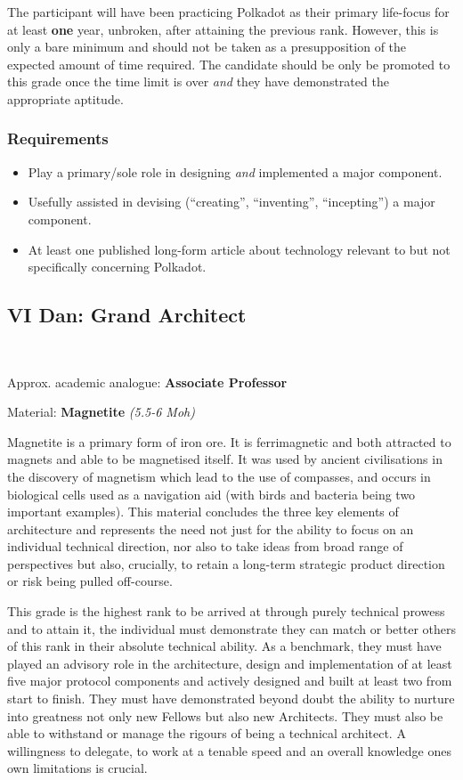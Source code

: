\documentclass[9pt,oneside]{amsart}
\begin{document}
The participant will have been practicing Polkadot as their primary life-focus for at least \textbf{one} year, unbroken, after attaining the previous rank. However, this is only a bare minimum and should not be taken as a presupposition of the expected amount of time required. The candidate should be only be promoted to this grade once the time limit is over \emph{and} they have demonstrated the appropriate aptitude.

\subsubsection{Requirements}\label{requirements-4}

\begin{itemize}
\item Play a primary/sole role in designing \emph{and} implemented a major component.
\item Usefully assisted in devising (``creating'', ``inventing'', ``incepting'') a major component.
\item At least one published long-form article about technology relevant to but not specifically concerning Polkadot.
\end{itemize}

\subsection{VI Dan: Grand Architect}\label{vi-dan-grand-architect}~\\


Approx. academic analogue: \textbf{Associate Professor}

Material: \textbf{Magnetite} \emph{(5.5-6 Moh)}

Magnetite is a primary form of iron ore. It is ferrimagnetic and both attracted to magnets and able to be magnetised itself. It was used by ancient civilisations in the discovery of magnetism which lead to the use of compasses, and occurs in biological cells used as a navigation aid (with birds and bacteria being two important examples). This material concludes the three key elements of architecture and represents the need not just for the ability to focus on an individual technical direction, nor also to take ideas from broad range of perspectives but also, crucially, to retain a long-term strategic product direction or risk being pulled off-course.

This grade is the highest rank to be arrived at through purely technical prowess and to attain it, the individual must demonstrate they can match or better others of this rank in their absolute technical ability. As a benchmark, they must have played an advisory role in the architecture, design and implementation of at least five major protocol components and actively designed and built at least two from start to finish. They must have demonstrated beyond doubt the ability to nurture into greatness not only new Fellows but also new Architects. They must also be able to withstand or manage the rigours of being a technical architect. A willingness to delegate, to work at a tenable speed and an overall knowledge ones own limitations is crucial.
\end{document}
